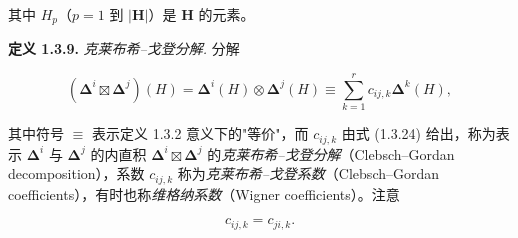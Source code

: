 其中 $H_{p}$（$p = 1$ 到 $|\mathbf{H}|$）是 $\mathbf{H}$ 的元素。

\textbf{定义 1.3.9.} \textit{克莱布希--戈登分解.} 分解

\begin{equation*}
(\boldsymbol{\Delta}^{i} \boxtimes \boldsymbol{\Delta}^{j})(H) = \boldsymbol{\Delta}^{i}(H) \otimes \boldsymbol{\Delta}^{j}(H) \equiv \sum_{k=1}^{r} c_{ij,k}\boldsymbol{\Delta}^{k}(H),
\tag{1.3.25}
\end{equation*}

其中符号 $\equiv$ 表示定义 1.3.2 意义下的"等价"，而 $c_{ij,k}$ 由式 (1.3.24) 给出，称为表示 $\boldsymbol{\Delta}^{i}$ 与 $\boldsymbol{\Delta}^{j}$ 的内直积 $\boldsymbol{\Delta}^{i} \boxtimes \boldsymbol{\Delta}^{j}$ 的\textit{克莱布希--戈登分解}（Clebsch--Gordan decomposition），系数 $c_{ij,k}$ 称为\textit{克莱布希--戈登系数}（Clebsch--Gordan coefficients），有时也称\textit{维格纳系数}（Wigner coefficients）。注意

\begin{equation*}
c_{ij,k} = c_{ji,k}. \tag{1.3.26}
\end{equation*}
